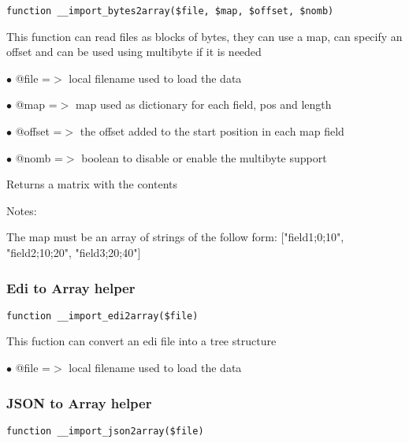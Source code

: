 \documentclass[a4paper]{article}
\begin{document}
\begin{lstlisting}
function __import_bytes2array($file, $map, $offset, $nomb)
\end{lstlisting}

This function can read files as blocks of bytes, they can use a map, can specify
an offset and can be used using multibyte if it is needed

\begin{compactitem}
\item[\color{myblue}$\bullet$] @file   =$>$ local filename used to load the data
\item[\color{myblue}$\bullet$] @map    =$>$ map used as dictionary for each field, pos and length
\item[\color{myblue}$\bullet$] @offset =$>$ the offset added to the start position in each map field
\item[\color{myblue}$\bullet$] @nomb   =$>$ boolean to disable or enable the multibyte support
\end{compactitem}

Returns a matrix with the contents

Notes:

The map must be an array of strings of the follow form:
["field1;0;10", "field2;10;20", "field3;20;40"]

\hypertarget{toc470}{}
\subsubsection{Edi to Array helper}

\begin{lstlisting}
function __import_edi2array($file)
\end{lstlisting}

This fuction can convert an edi file into a tree structure

\begin{compactitem}
\item[\color{myblue}$\bullet$] @file =$>$ local filename used to load the data
\end{compactitem}

\hypertarget{toc471}{}
\subsubsection{JSON to Array helper}

\begin{lstlisting}
function __import_json2array($file)
\end{lstlisting}
\end{document}
